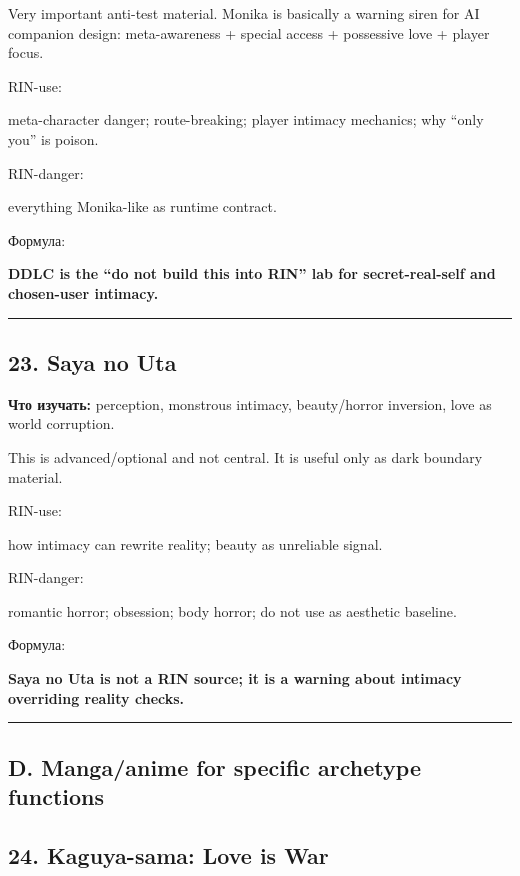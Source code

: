 Very important anti-test material. Monika is basically a warning siren
for AI companion design: meta-awareness + special access + possessive
love + player focus.

RIN-use:

meta-character danger; route-breaking; player intimacy mechanics; why
``only you'' is poison.

RIN-danger:

everything Monika-like as runtime contract.

Формула:

\textbf{DDLC is the ``do not build this into RIN'' lab for
secret-real-self and chosen-user intimacy.}

\begin{center}\rule{0.5\linewidth}{0.5pt}\end{center}

\subsection*{23. Saya no Uta}

\textbf{Что изучать:} perception, monstrous intimacy, beauty/\hspace{0pt}horror
inversion, love as world corruption.

This is advanced/\hspace{0pt}optional and not central. It is useful only as dark
boundary material.

RIN-use:

how intimacy can rewrite reality; beauty as unreliable signal.

RIN-danger:

romantic horror; obsession; body horror; do not use as aesthetic
baseline.

Формула:

\textbf{Saya no Uta is not a RIN source; it is a warning about intimacy
overriding reality checks.}

\begin{center}\rule{0.5\linewidth}{0.5pt}\end{center}

\subsection*{D. Manga/\hspace{0pt}anime for specific archetype functions}

\subsection*{24. Kaguya-sama: Love is War}

